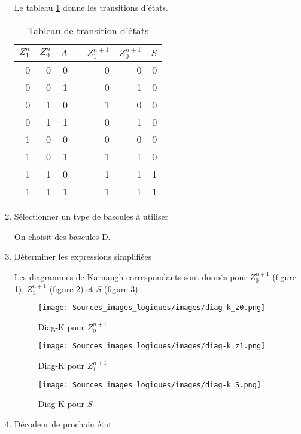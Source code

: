 \documentclass[11pt]{article}
\begin{document}
\begin{enumerate}
Le tableau \ref{tab:org0cc762f} donne les transitions d'états. 

\begin{table}[htbp]
\caption{\label{tab:org0cc762f}Tableau de transition d'états}
\centering
\begin{tabular}{rrrlrrr}
\(Z_1^n\) & \(Z_0^n\) & \(A\) &  & \(Z_1^{n+1}\) & \(Z_0^{n+1}\) & \(S\)\\
\hline
0 & 0 & 0 &  & 0 & 0 & 0\\
0 & 0 & 1 &  & 0 & 1 & 0\\
0 & 1 & 0 &  & 1 & 0 & 0\\
0 & 1 & 1 &  & 0 & 1 & 0\\
1 & 0 & 0 &  & 0 & 0 & 0\\
1 & 0 & 1 &  & 1 & 1 & 0\\
1 & 1 & 0 &  & 1 & 1 & 1\\
1 & 1 & 1 &  & 1 & 1 & 1\\
\end{tabular}
\end{table}


\item Sélectionner un type de bascules à utiliser
\label{sec:org165d45f}

On choisit des bascules D. 

\item Déterminer les expressions simplifiées
\label{sec:org5ec0fc1}

Les diagrammes de Karnaugh correspondants sont donnés pour
\(Z_0^{n+1}\) (figure \ref{fig:org6636b07}), \(Z_1^{n+1}\) (figure
\ref{fig:org9ba9e24}) et \(S\) (figure \ref{fig:org51dd198}).

\begin{figure}[htbp]
\centering
\texttt{[image: Sources\_images\_logiques/images/diag-k\_z0.png]}
\caption{\label{fig:org6636b07}Diag-K pour \(Z_0^{n+1}\)}
\end{figure}

\begin{figure}[htbp]
\centering
\texttt{[image: Sources\_images\_logiques/images/diag-k\_z1.png]}
\caption{\label{fig:org9ba9e24}Diag-K pour \(Z_1^{n+1}\)}
\end{figure}

\begin{figure}[htbp]
\centering
\texttt{[image: Sources\_images\_logiques/images/diag-k\_S.png]}
\caption{\label{fig:org51dd198}Diag-K pour \(S\)}
\end{figure}

\item Décodeur de prochain état
\label{sec:org6e1baa5}


\end{enumerate}
\end{document}
